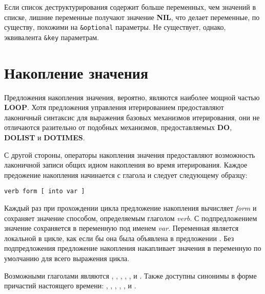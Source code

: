 Если список деструктурирования содержит больше переменных, чем значений в списке, лишние
переменные получают значение \textbf{NIL}, что делает переменные, по существу, похожими на
\lstinline!&optional! параметры. Не существует, однако, эквивалента \lstinline!&key!
параметрам.

\section{Накопление значения}

Предложения накопления значения, вероятно, являются наиболее мощной частью
\textbf{LOOP}. Хотя предложения управления итерированием предоставляют лаконичный
синтаксис для выражения базовых механизмов итерирования, они не отличаются разительно от
подобных механизмов, предоставляемых \textbf{DO}, \textbf{DOLIST} и \textbf{DOTIMES}.

С другой стороны, операторы накопления значения предоставляют возможность лаконичной
записи общих идиом накопления во время итерирования. Каждое предожение накопления
начинается с глагола и следует следующему образцу:

\begin{lstlisting}[style=lisprepl]
  verb form [ into var ]
\end{lstlisting}

Каждый раз при прохождении цикла предложение накопления вычисляет \textit{form} и
сохраняет значение способом, определяемым глаголом \textit{verb}. С подпредложением
 значение сохраняется в переменную под именем \textit{var}. Переменная является
локальной в цикле, как если бы она была объявлена в предложении . Без
подпредложения  предложение накопления накапливает значения в переменную по
умолчанию для всего выражения цикла.

Возможными глаголами являются , , , ,
,  и . Также доступны синонимы в форме причастий
настоящего времени: , , , ,
,  и .


